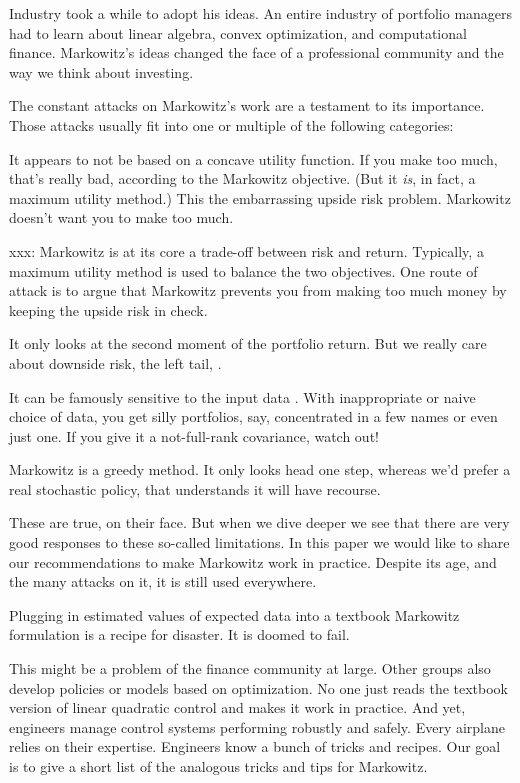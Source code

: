 Industry took a while to adopt his ideas.
An entire industry of portfolio managers had to learn about linear algebra, convex optimization, and
computational finance.
Markowitz's ideas changed the face of a professional community
and the way we think about investing.

The constant attacks on Markowitz's work are a testament to its importance.
Those attacks usually fit into one or multiple of the following categories:

\BIT
\item It appears to not be based on a concave utility function.
If you make too much,
that's really bad, according to the Markowitz objective.
(But it \emph{is}, in fact,
a maximum utility method.)  This the embarrassing upside risk problem.
Markowitz doesn't want you to make too much.

xxx:
Markowitz is at its core a trade-off between risk and return.
Typically, a maximum utility method is used to balance
the two objectives.
One route of attack is to argue that Markowitz
prevents you from making too much money by
keeping the upside risk in check.

\item
It only looks at the second moment of the portfolio return.
But we really care about downside risk, the left tail, \etc.


\item
It can be famously sensitive to the input data \cite{michaud1998efficient}.
With inappropriate or naive choice of
data, you get silly portfolios, say, concentrated in a few names or even just one.
If you give it a not-full-rank covariance, watch out!

\item Markowitz is a greedy method.
It only looks head one step, whereas we'd prefer a real
stochastic policy, that understands it will have recourse.
\EIT

These are true, on their face.
But when we dive deeper we see that there are very good responses
to these so-called limitations.
In this paper we would like to share our
recommendations to make Markowitz work in practice.
Despite its age, and the many attacks on it,
it is still used everywhere.

Plugging in estimated values of expected data into a textbook Markowitz formulation
is a recipe for disaster.
It is doomed to fail.

This might be a problem of the finance community at large.
Other groups also develop policies or models based on optimization.
No one just reads the textbook version of linear quadratic control
and makes it work in practice.
And yet, engineers manage control systems performing
robustly and safely.
Every airplane relies on their expertise.
Engineers know a bunch of tricks and recipes.
Our goal is to give a short list of the analogous tricks and tips for Markowitz.

